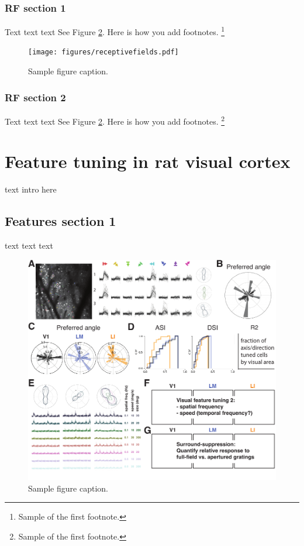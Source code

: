 \documentclass{article}
\begin{document}
\subsubsection{RF section 1}
Text text text
See Figure \ref{fig:fig1}. Here is how you add footnotes. \footnote{Sample of the first footnote.}

\begin{figure}[ht]
  \centering
  \texttt{[image: figures/receptivefields.pdf]}
  \caption{Sample figure caption.}
  \label{fig:fig1}
\end{figure}

\subsubsection{RF section 2}
Text text text
See Figure \ref{fig:fig1}. Here is how you add footnotes. \footnote{Sample of the first footnote.}


\section{Feature tuning in rat visual cortex}
\label{sec:others}
text intro here

\subsection{Features section 1}
text text text

\begin{figure}[ht]
  \centering
  \includegraphics{figures/features.pdf}
  \caption{Sample figure caption.}
  \label{fig:fig1}
\end{figure}
\end{document}
